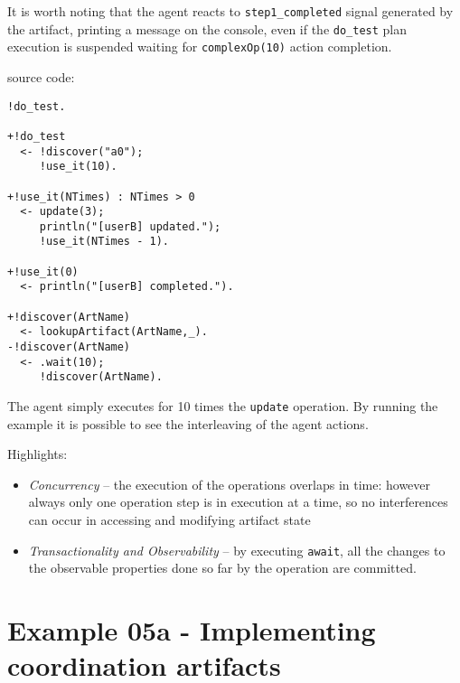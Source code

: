 \documentclass[11pt]{report}
\newcommand\code[1]{{\small{\mbox{\texttt{{#1}}}}}}
\begin{document}
\noindent It is worth noting that the agent reacts to \code{step1\_completed} signal generated by the artifact, printing a message on the console, even if the \code{do\_test} plan execution is suspended waiting for \code{complexOp(10)} action completion.

\medskip

\noindent \code{complexop\_userB} source code:
{\small{\begin{verbatim}
!do_test.

+!do_test 
  <- !discover("a0");
     !use_it(10).     
     
+!use_it(NTimes) : NTimes > 0 
  <- update(3);
     println("[userB] updated.");
     !use_it(NTimes - 1).
          
+!use_it(0) 
  <- println("[userB] completed.").
     
+!discover(ArtName)
  <- lookupArtifact(ArtName,_).
-!discover(ArtName)
  <- .wait(10);
     !discover(ArtName).
\end{verbatim}}}
%
\noindent The agent simply executes for 10 times the \code{update} operation.
%
By running the example it is possible to see the interleaving of the agent actions.

\medskip

\noindent Highlights:

\begin{itemize}
%
\item {\emph{Concurrency}} -- the execution of the operations overlaps in time: however always only one operation step is in execution at a time, so no interferences can occur in accessing and modifying artifact state
%
\item {\emph{Transactionality and Observability}} -- by executing \code{await}, all the changes to the observable properties done so far by the operation are committed.
%
\end{itemize} 


\newpage
\section{Example 05a - Implementing coordination artifacts}
\end{document}
